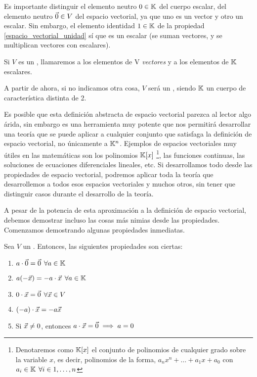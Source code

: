 \documentclass[../algebra_lineal.tex]{subfiles}
\begin{document}
\begin{remark}
    Es importante distinguir el elemento neutro $0 \in \mathbb{K}$ del cuerpo escalar, del elemento neutro $\vec{0} \in V$ del espacio vectorial, ya que uno es un vector y otro un escalar. Sin embargo, el elemento identidad $1 \in \mathbb{K}$ de la propiedad \ref{espacio_vectorial_unidad} sí que es un escalar (se suman vectores, y se multiplican vectores con escalares).  
\end{remark}

\begin{notation}
    Si $V$ es un \kvspace, llamaremos a los elementos de V \textit{vectores} y a los elementos de $\mathbb{K}$ escalares.
\end{notation}

A partir de ahora, si no indicamos otra cosa, $V$ será un \kvspace, siendo $\mathbb{K}$ un cuerpo de característica distinta de 2.

Es posible que esta definición abstracta de espacio vectorial parezca al lector algo árida, sin embargo es una herramienta muy potente que nos permitirá desarrollar una teoría que se puede aplicar a cualquier conjunto que satisfaga la definición de espacio vectorial, no únicamente a $\mathbb{K}^n$. Ejemplos de espacios vectoriales muy útiles en las matemáticas son los polinomios $\mathbb{K}[x]$ \footnote{Denotaremos como $\mathbb{K}[x]$ el conjunto de polinomios de cualquier grado sobre la variable $x$, es decir, polinomios de la forma, $a_n x^n + \dots + a_1 x + a_0$ con $a_i \in \mathbb{K} \hspace{1.5mm} \forall i \in {1, \dots, n}$}, las funciones continuas, las soluciones de ecuaciones diferenciales lineales, etc. Si desarrollamos todo desde las propiedades de espacio vectorial, podremos aplicar toda la teoría que desarrollemos a todos esos espacios vectoriales y muchos otros, sin tener que distinguir casos durante el desarrollo de la teoría.

A pesar de la potencia de esta aproximación a la definición de espacio vectorial, debemos demostrar incluso las cosas más nimias desde las propiedades. Comenzamos demostrando algunas propiedades inmediatas.

\begin{proposition}
    Sea $V$ un \kvspace. Entonces, las siguientes propiedades son ciertas:
    \begin{enumerate}
        \item $a \cdot \vec{0} = \vec{0} \hspace{1.5mm} \forall a \in \mathbb{K}$
        \item $a(-\vec{x}) = -a\cdot \vec{x} \hspace{1.5mm} \forall a \in \mathbb{K}$
        \item $0 \cdot \vec{x} = \vec{0} \hspace{1.5mm} \forall \vec{x} \in V$
        \item \label{propiedad_cuatro_espacios_vectoriales} $(-a)\cdot \vec{x} = -a\vec{x}$
        \item Si $\vec{x} \ne 0$, entonces $a \cdot \vec{x} = \vec{0} \implies a = 0$
    \end{enumerate}
\end{proposition}
\end{document}
